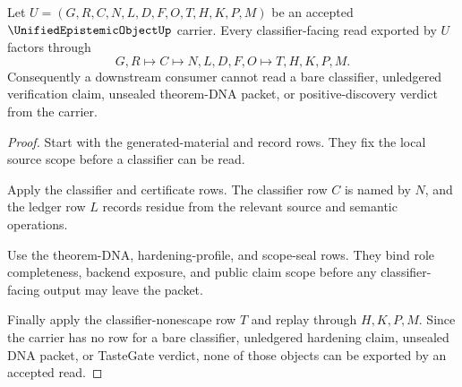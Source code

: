 \begin{theorem}
\label{thm:unified-epistemic-object-classifier-nonescape}
Let $U=(G,R,C,N,L,D,F,O,T,H,K,P,M)$ be an accepted $\UnifiedEpistemicObjectUp$ carrier. Every classifier-facing read exported by $U$ factors through
$$
G,R \longmapsto C \longmapsto N,L,D,F,O \longmapsto T,H,K,P,M .
$$
Consequently a downstream consumer cannot read a bare classifier, unledgered verification claim, unsealed theorem-DNA packet, or positive-discovery verdict from the carrier.
\end{theorem}
\begin{proof}
Start with the generated-material and record rows. They fix the local source scope before a classifier can be read.

Apply the classifier and certificate rows. The classifier row $C$ is named by $N$, and the ledger row $L$ records residue from the relevant source and semantic operations.

Use the theorem-DNA, hardening-profile, and scope-seal rows. They bind role completeness, backend exposure, and public claim scope before any classifier-facing output may leave the packet.

Finally apply the classifier-nonescape row $T$ and replay through $H,K,P,M$. Since the carrier has no row for a bare classifier, unledgered hardening claim, unsealed DNA packet, or TasteGate verdict, none of those objects can be exported by an accepted read.
\end{proof}




